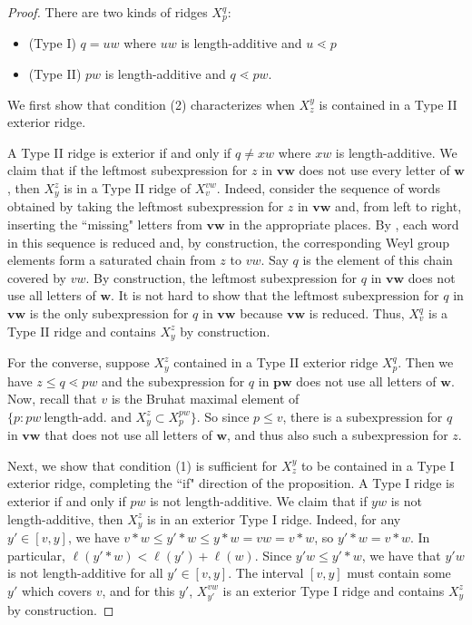 \documentclass[10pt,a4paper]{amsart}
\def\bw{\mathbf{w}}
\def\bp{\mathbf{p}}
\def\bv{\mathbf{v}}
\begin{document}
\begin{proof}
There are two kinds of ridges $X_p^q$: 
\begin{itemize}
	\item (Type I) $q=uw$ where $uw$ is length-additive and $u \lessdot p$
	\item(Type II) $pw$ is length-additive and $q \lessdot pw$.
\end{itemize} 
	We first show that condition (2) characterizes when $X^y_z$ is contained in a Type II exterior ridge.
	
	
	A Type II ridge is exterior if and only if $q \neq xw$ where $xw$ is length-additive. We claim that if the leftmost subexpression for $z$ in $\bv \bw$ does not use every letter of $\bw$, then $X_y^z$ is in a Type II ridge of $X_v^{vw}$. Indeed, consider the sequence of words obtained by taking the leftmost subexpression for $z$ in $\bv \bw$ and, from left to right, inserting the ``missing" letters from $\bv \bw$ in the appropriate places. By \cite[Lemma 2.2.1]{BB05}, each word in this sequence is reduced and, by construction, the corresponding Weyl group elements form a saturated chain from $z$ to $vw$. Say $q$ is the element of this chain covered by $vw$. By construction, the leftmost subexpression for $q$ in $\bv \bw$ does not use all letters of $\bw$. It is not hard to show that the leftmost subexpression for $q$ in $\bv \bw$ is the only subexpression for $q$ in $\bv\bw$ because $\bv \bw$ is reduced. Thus, $X_v^q$ is a Type II ridge and contains $X_y^z$ by construction.
	
	For the converse, suppose $X_y^z$ contained in a Type II exterior ridge $X_p^q$. Then we have $z \leq q \lessdot pw$ and the subexpression for $q$ in $\bp \bw$ does not use all letters of $\bw$. Now, recall that $v$ is the Bruhat maximal element of $\{p: pw~\text{length-add. and }X_y^z \subset X_p^{pw}\}$. So since $p \leq v$, there is a subexpression for $q$ in $\bv \bw$ that does not use all letters of $\bw$, and thus also such a subexpression for $z$.
	
	
	Next, we show that condition (1) is sufficient for $X^y_z$ to be contained in a Type I exterior ridge, completing the ``if" direction of the proposition. A Type I ridge is exterior if and only if $pw$ is not length-additive. We claim that if $yw$ is not length-additive, then $X_y^z$ is in an exterior Type I ridge. Indeed, for any $y' \in [v,y]$, we have $v * w \leq  y' * w \leq y*w = vw = v*w$, so $y'*w = v*w$. In particular, $\ell(y' * w) < \ell(y') + \ell(w)$. Since $y' w \leq y' * w$, we have that $y' w$ is not length-additive for all $y' \in [v, y]$. The interval $[v,y]$ must contain some $y'$ which covers $v$, and for this $y'$, $X_{y'}^{vw}$ is an exterior Type I ridge and contains $X_y^z$ by construction.
	

\end{proof}
\end{document}
